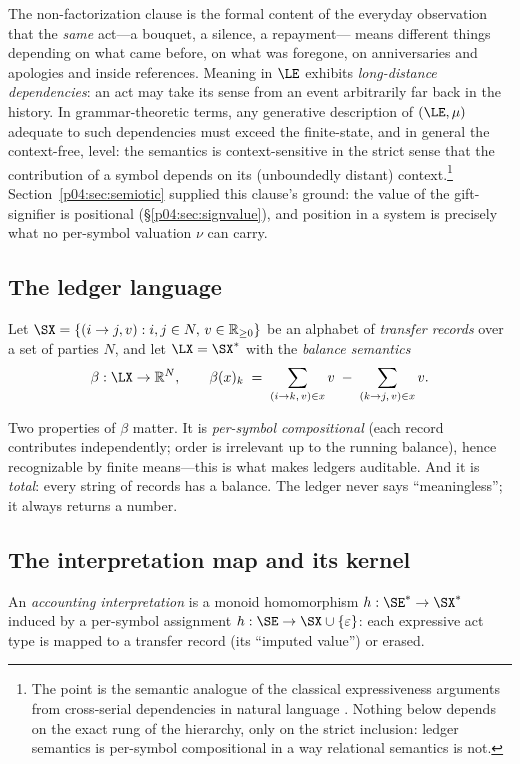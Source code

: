 The non-factorization clause is the formal content of the everyday
observation that the \emph{same} act---a bouquet, a silence, a repayment---
means different things depending on what came before, on what was foregone,
on anniversaries and apologies and inside references. Meaning in $\LE$
exhibits \emph{long-distance dependencies}: an act may take its sense from an
event arbitrarily far back in the history. In grammar-theoretic terms, any
generative description of $(\LE,\mu)$ adequate to such dependencies must
exceed the finite-state, and in general the context-free, level: the
semantics is context-sensitive in the strict sense that the contribution of a
symbol depends on its (unboundedly distant) context.\footnote{The point is
the semantic analogue of the classical expressiveness arguments from
cross-serial dependencies in natural language \parencite{shieber1985}. Nothing
below depends on the exact rung of the hierarchy, only on the strict
inclusion: ledger semantics is per-symbol compositional in a way relational
semantics is not.} Section~\ref{p04:sec:semiotic} supplied this clause's ground:
the value of the gift-signifier is positional (\S\ref{p04:sec:signvalue}), and
position in a system is precisely what no per-symbol valuation $\nu$ can
carry.

\subsection{The ledger language}
\begin{definition}[Ledger]
\label{p04:def:ledger}
Let $\SX = \{(i \to j, v) : i,j \in N,\, v \in \mathbb{R}_{\ge 0}\}$ be an
alphabet of \emph{transfer records} over a set of parties $N$, and let
$\LX = \SX^{*}$ with the \emph{balance semantics}
\[
\beta : \LX \to \mathbb{R}^{N}, \qquad
\beta(x)_k \;=\; \sum_{(i\to k,\,v)\in x} v \;-\; \sum_{(k\to j,\,v)\in x} v .
\]
\end{definition}

Two properties of $\beta$ matter. It is \emph{per-symbol compositional}
(each record contributes independently; order is irrelevant up to the
running balance), hence recognizable by finite means---this is what makes
ledgers auditable. And it is \emph{total}: every string of records has a
balance. The ledger never says ``meaningless''; it always returns a number.

\subsection{The interpretation map and its kernel}
\begin{definition}
\label{p04:def:interp}
An \emph{accounting interpretation} is a monoid homomorphism
$h:\SE^{*}\to\SX^{*}$ induced by a per-symbol assignment
$h:\SE\to\SX\cup\{\varepsilon\}$: each expressive act type is mapped to a
transfer record (its ``imputed value'') or erased.
\end{definition}

